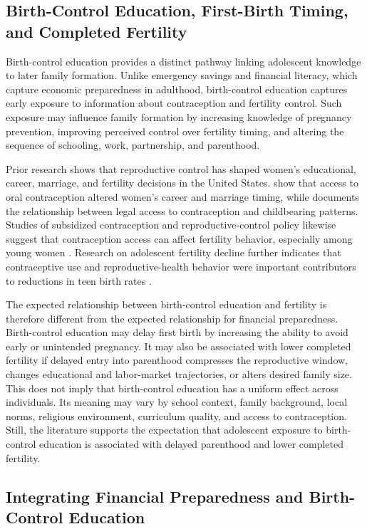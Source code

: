 \documentclass[12pt]{article}
\begin{document}
\subsection{Birth-Control Education, First-Birth Timing, and Completed Fertility}

Birth-control education provides a distinct pathway linking adolescent knowledge to later family formation. Unlike emergency savings and financial literacy, which capture economic preparedness in adulthood, birth-control education captures early exposure to information about contraception and fertility control. Such exposure may influence family formation by increasing knowledge of pregnancy prevention, improving perceived control over fertility timing, and altering the sequence of schooling, work, partnership, and parenthood.

Prior research shows that reproductive control has shaped women's educational, career, marriage, and fertility decisions in the United States. \citet{goldin2002} show that access to oral contraception altered women's career and marriage timing, while \citet{bailey2010} documents the relationship between legal access to contraception and childbearing patterns. Studies of subsidized contraception and reproductive-control policy likewise suggest that contraception access can affect fertility behavior, especially among young women \citep{kearney2009,myers2017}. Research on adolescent fertility decline further indicates that contraceptive use and reproductive-health behavior were important contributors to reductions in teen birth rates \citep{lindberg2016}.

The expected relationship between birth-control education and fertility is therefore different from the expected relationship for financial preparedness. Birth-control education may delay first birth by increasing the ability to avoid early or unintended pregnancy. It may also be associated with lower completed fertility if delayed entry into parenthood compresses the reproductive window, changes educational and labor-market trajectories, or alters desired family size. This does not imply that birth-control education has a uniform effect across individuals. Its meaning may vary by school context, family background, local norms, religious environment, curriculum quality, and access to contraception. Still, the literature supports the expectation that adolescent exposure to birth-control education is associated with delayed parenthood and lower completed fertility.

\subsection{Integrating Financial Preparedness and Birth-Control Education}
\end{document}
